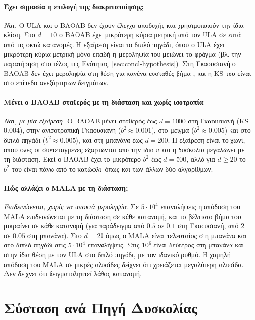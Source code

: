 \paragraph{Έχει σημασία η επιλογή της διακριτοποίησης;}
\emph{Ναι.} Ο ULA και ο BAOAB δεν έχουν έλεγχο αποδοχής και χρησιμοποιούν την
ίδια κλίση. Στο $d=10$ ο BAOAB έχει μικρότερη κύρια μετρική από τον ULA σε επτά από τις
οκτώ κατανομές. Η εξαίρεση είναι το διπλό πηγάδι, όπου ο ULA έχει μικρότερη κύρια μετρική μόνο επειδή η
μεροληψία του μειώνει το φράγμα (βλ. την παρατήρηση στο τέλος της Ενότητας~\ref{sec:concl-hypothesis}). Στη Γκαουσιανή ο BAOAB δεν έχει
μεροληψία στη θέση για κανένα ευσταθές βήμα \citep{leimkuhler2013bao}, και η KS του
είναι στο επίπεδο ανεξάρτητων δειγμάτων.

\paragraph{Μένει ο BAOAB σταθερός με τη διάσταση και χωρίς ισοτροπία;}
\emph{Ναι, με μία εξαίρεση.} Ο BAOAB μένει σταθερός έως $d=1000$ στη
Γκαουσιανή (KS $0.004$), στην ανισοτροπική Γκαουσιανή ($b^2 \approx 0.001$), στο
μείγμα ($b^2 \approx 0.005$) και στο διπλό πηγάδι ($b^2 \approx 0.005$), και στη
μπανάνα έως $d=200$. Η εξαίρεση είναι το χωνί, όπου όλες οι συντεταγμένες εξαρτώνται
από την ίδια $v$ και η δυσκολία μεγαλώνει με τη διάσταση. Εκεί ο BAOAB έχει το
μικρότερο $b^2$ έως $d=500$, αλλά για $d \ge 20$ το $b^2$ του είναι πάνω από το κατώφλι,
όπως και των άλλων δύο αλγορίθμων.

\paragraph{Πώς αλλάζει ο MALA με τη διάσταση;}
\emph{Επιδεινώνεται, χωρίς να αποκτά μεροληψία.} Σε $5 \cdot 10^4$ επαναλήψεις η απόδοση του MALA επιδεινώνεται με τη διάσταση
σε κάθε κατανομή, και το βέλτιστο βήμα του μικραίνει σε κάθε κατανομή (για παράδειγμα
από $0.5$ σε $0.1$ στη Γκαουσιανή, από $2$ σε $0.05$ στη μπανάνα). Στο $d=20$ όμως ο
MALA είναι τελευταίος στη μπανάνα και στο διπλό πηγάδι στις $5 \cdot 10^4$ επαναλήψεις.
Στις $10^6$ είναι δεύτερος στη μπανάνα και στην ίδια θέση με τον ULA στο διπλό πηγάδι, με
τον ιδανικό ρυθμό. Η χαμηλή απόδοση του MALA σε μικρές αλυσίδες δείχνει
ότι χρειάζεται μεγαλύτερη αλυσίδα. Δεν δείχνει ότι δειγματοληπτεί λάθος κατανομή.

\section{Σύσταση ανά Πηγή Δυσκολίας}
\label{sec:concl-recommendation}

